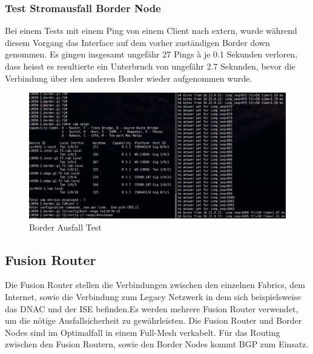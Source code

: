 \subsubsection{Test Stromausfall Border Node}
Bei einem Tests mit einem Ping von einem Client nach extern, wurde während diesem Vorgang das Interface auf dem vorher zuständigen Border down genommen. Es gingen insgesamt ungefähr 27 Pings à je 0.1 Sekunden verloren, dass heisst es resultierte ein Unterbruch von ungefähr 2.7 Sekunden, bevor die Verbindung über den anderen Border wieder aufgenommen wurde.


\begin{figure}[H]
	\centering
	\includegraphics[width=1\linewidth]{img/Absicherung/border-ausfall-test}
	\caption{Border Ausfall Test}
	\label{fig:Border Ausfall Test}
\end{figure}

\subsection{Fusion Router}
Die Fusion Router stellen die Verbindungen zwischen den einzelnen Fabrics, dem Internet, sowie die Verbindung zum Legacy Netzwerk in dem sich beispielsweise das DNAC und der ISE befinden.Es werden mehrere Fusion Router verwendet, um die nötige Ausfallsicherheit zu gewährleisten. Die Fusion Router und Border Nodes sind im Optimalfall in einem Full-Mesh verkabelt. Für das Routing zwischen den Fusion Routern, sowie den Border Nodes kommt BGP zum Einsatz.

